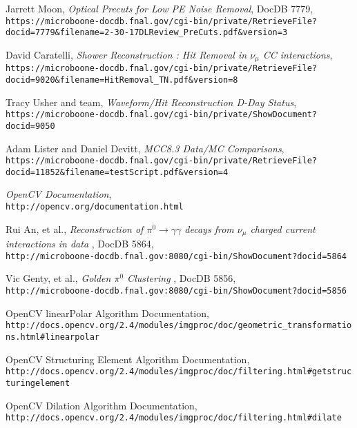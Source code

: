\documentclass{article}
\begin{document}
\begin{thebibliography}{9}
  Jarrett Moon, \emph{Optical Precuts for
Low PE Noise Removal}, DocDB 7779,\\
\texttt{https://microboone-docdb.fnal.gov/cgi-bin/private/RetrieveFile?docid=7779\&filename=2-30-17DLReview\_PreCuts.pdf\&version=3}

  David Caratelli, \emph{Shower Reconstruction : Hit Removal in $\nu_{\mu}$ CC interactions},\\
  \texttt{https://microboone-docdb.fnal.gov/cgi-bin/private/RetrieveFile?docid=9020\&filename=HitRemoval\_TN.pdf\&version=8}

  Tracy Usher and team, \emph{Waveform/Hit Reconstruction D-Day Status},\\
  \texttt{https://microboone-docdb.fnal.gov/cgi-bin/private/ShowDocument?docid=9050}

  Adam Lister and Daniel Devitt, \emph{MCC8.3 Data/MC Comparisons},\\
  \texttt{https://microboone-docdb.fnal.gov/cgi-bin/private/RetrieveFile?docid=11852\&filename=testScript.pdf\&version=4} 
  
  \emph{OpenCV Documentation},\\
  \texttt{http://opencv.org/documentation.html}

  Rui An, et al., \emph{Reconstruction of $\pi^0 \rightarrow \gamma\gamma$ decays from $\nu_\mu$ charged current interactions in data }, DocDB 5864,\\
   \texttt{http://microboone-docdb.fnal.gov:8080/cgi-bin/ShowDocument?docid=5864}

   Vic Genty, et al., \emph{Golden $\pi^0$ Clustering }, DocDB 5856,\\
   \texttt{http://microboone-docdb.fnal.gov:8080/cgi-bin/ShowDocument?docid=5856}

  OpenCV linearPolar Algorithm Documentation, \\
  \texttt{http://docs.opencv.org/2.4/modules/imgproc/doc/geometric\_transformations.html\#linearpolar}

  OpenCV Structuring Element Algorithm Documentation, \\
  \texttt{http://docs.opencv.org/2.4/modules/imgproc/doc/filtering.html\#getstructuringelement}

  OpenCV Dilation Algorithm Documentation, \\
  \texttt{http://docs.opencv.org/2.4/modules/imgproc/doc/filtering.html\#dilate}


\end{thebibliography}
\end{document}
